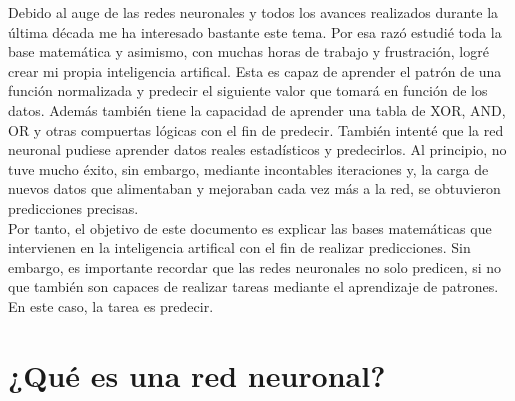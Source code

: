 \documentclass[12pt]{article}
\begin{document}
\begin{onehalfspace}
      Debido al auge de las redes neuronales y todos los
      avances realizados durante la \'{u}ltima d\'{e}cada
      me ha interesado bastante este tema. Por esa raz\'{o}
      estudi\'{e} toda la base matem\'{a}tica y asimismo, 
      con muchas horas de trabajo y frustraci\'{o}n, logr\'{e}
      crear mi propia inteligencia artifical. Esta es capaz
      de aprender el patr\'{o}n de una funci\'{o}n normalizada
      y predecir el siguiente valor que tomar\'{a} en funci\'{o}n
      de los datos. Adem\'{a}s tambi\'{e}n tiene la capacidad de
      aprender una tabla de XOR, AND, OR y otras compuertas l\'{o}gicas
      con el fin de predecir. Tambi\'{e}n intent\'{e} que la red
      neuronal pudiese aprender datos reales estad\'{i}sticos y predecirlos.
      Al principio, no tuve mucho \'{e}xito, sin embargo, mediante 
      incontables iteraciones y, la carga de nuevos datos que alimentaban y 
      mejoraban cada vez m\'{a}s a la red, se obtuvieron predicciones
      precisas. \\
      Por tanto, el objetivo de este documento es explicar las bases
      matem\'{a}ticas que intervienen en la inteligencia artifical con 
      el fin de realizar predicciones. Sin embargo, es
      importante recordar que las redes neuronales no solo predicen, si no 
      que tambi\'{e}n son capaces de realizar tareas mediante el aprendizaje
      de patrones. En este caso, la tarea es predecir. \\


      \section*{¿Qué es una red neuronal?}

      



        
        
     
    
      
        

        

        
        
%
   \end{onehalfspace}
\end{document}
